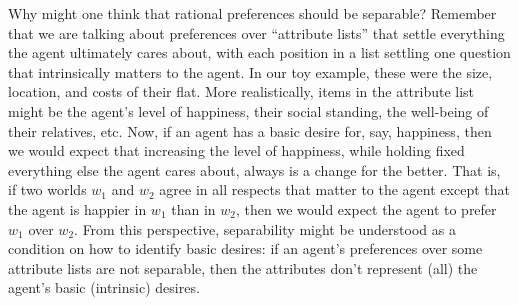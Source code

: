 Why might one think that rational preferences should be separable? Remember that
we are talking about preferences over ``attribute lists'' that settle everything
the agent ultimately cares about, with each position in a list settling one
question that intrinsically matters to the agent. In our toy example, these were
the size, location, and costs of their flat. More realistically, items in the
attribute list might be the agent's level of happiness, their social standing,
the well-being of their relatives, etc. Now, if an agent has a basic desire for,
say, happiness, then we would expect that increasing the level of happiness,
while holding fixed everything else the agent cares about, always is a change
for the better. That is, if two worlds $w_{1}$ and $w_{2}$ agree in all respects
that matter to the agent except that the agent is happier in $w_{1}$ than in
$w_{2}$, then we would expect the agent to prefer $w_{1}$ over $w_{2}$. From
this perspective, separability might be understood as a condition on how to
identify basic desires: if an agent's preferences over some attribute lists are
not separable, then the attributes don't represent (all) the agent's basic
(intrinsic) desires.

